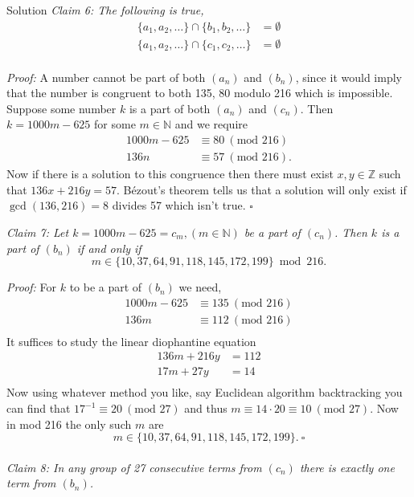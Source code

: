 \documentclass{article}
\begin{document}
\begin{solution}{Solution}
\textit{Claim 6: The following is true,}
\[
\begin{aligned}
\{a_1, a_2, \ldots \} \cap \{b_1, b_2, \ldots \} &= \emptyset\\
\{a_1, a_2, \ldots \} \cap \{c_1, c_2, \ldots \} &= \emptyset\\
\end{aligned}
\]

\textit{Proof:} A number cannot be part of both $(a_n)$ and $(b_n)$,
since it would
imply that the number is congruent to both 135, 80 modulo 216 which is
impossible. Suppose some number $k$ is a part of both $(a_n)$ and $(c_n)$.
Then $k = 1000m - 625$ for some $m \in \mathbb{N}$ and we require
\[
\begin{aligned}
1000m - 625 &\equiv 80 \ (\text{mod } 216) \\
136n &\equiv 57 \ (\text{mod } 216).
\end{aligned}
\]
Now if there is a solution to this congruence then there must exist
$x, y \in \mathbb{Z}$ such that $136x + 216y = 57$. Bézout's theorem tells
us that a solution will only exist if $\gcd(136, 216) = 8$ divides 57 which
isn't true. $\square$
\\ \bigskip

\textit{Claim 7: Let $k = 1000m - 625 = c_m, (m\in \mathbb{N})$ be a part of
$(c_n)$. Then $k$ is a part of $(b_n)$ if and only if
$$
m \in \{ 10,37,64,91,118,145,172,199 \} \bmod 216.
$$
}

\textit{Proof:} For $k$ to be a part of $(b_n)$ we need,
\[
\begin{aligned}
1000m - 625 &\equiv 135 \ (\text{mod } 216) \\
136m &\equiv 112 \ (\text{mod } 216) \\
\end{aligned}
\]
It suffices to study the linear diophantine equation
\[
\begin{aligned}
136m + 216y &= 112\\
17m + 27y &= 14 \\
\end{aligned}
\]
Now using whatever method you like, say Euclidean algorithm backtracking
you can find that $17^{-1} \equiv 20 \ (\text{mod } 27)$ and thus
$m \equiv 14 \cdot 20 \equiv 10 \ (\text{mod } 27)$. Now
in mod 216 the only such $m$ are
$$
m \in \{ 10,37,64,91,118,145,172,199 \}. \ \square
$$
\\

\textit{Claim 8: In any group of 27 consecutive terms from $(c_n)$
there is exactly one term from $(b_n)$.} \vspace{0.2cm}


\end{solution}
\end{document}
